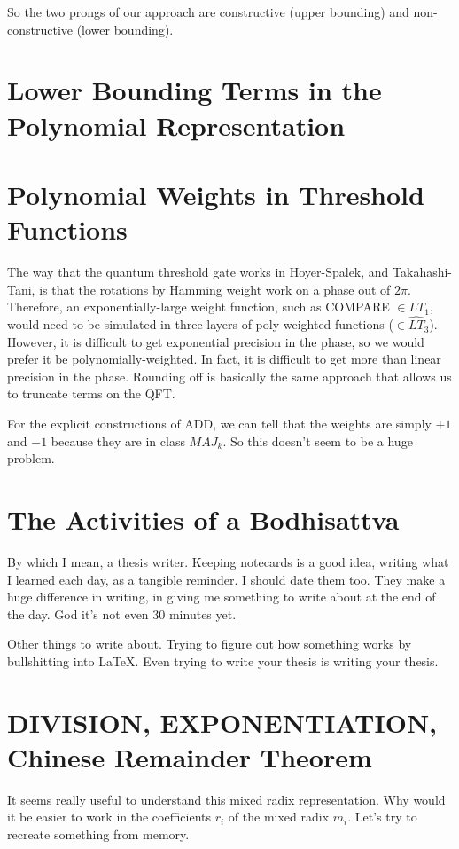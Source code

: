 \documentclass{article}
\begin{document}
So the two prongs of our approach are constructive (upper bounding) 
and non-constructive (lower bounding).

\section{Lower Bounding Terms in the Polynomial Representation}

\section{Polynomial Weights in Threshold Functions}

The way that the quantum threshold gate works in Hoyer-Spalek, and
Takahashi-Tani, is that the rotations by Hamming weight work on a phase
out of $2\pi$. Therefore, an exponentially-large weight function, such
as COMPARE $\in LT_1$, would need to be simulated in three layers of
poly-weighted functions ($\in \hat{LT}_3$). However, it is difficult
to get exponential precision in the phase, so we would prefer it be
polynomially-weighted. In fact, it is difficult to get more than linear
precision in the phase. Rounding off is basically the same approach
that allows us to truncate terms on the QFT.

For the explicit constructions of ADD, we can tell that the weights
are simply $+1$ and $-1$ because they are in class $MAJ_k$.
So this doesn't seem to be a huge problem.

\section{The Activities of a Bodhisattva}

By which I mean, a thesis writer. Keeping notecards is a good idea,
writing what I learned each day, as a tangible reminder. I should date
them too. They make a huge difference in writing, in giving me something
to write about at the end of the day. God it's not even 30 minutes yet.

Other things to write about. Trying to figure out how something works by
bullshitting into LaTeX. Even trying to write your thesis is writing your 
thesis.

\section{DIVISION, EXPONENTIATION, Chinese Remainder Theorem}

It seems really useful to understand this mixed radix representation.
Why would it be easier to work in the coefficients $r_i$ of the
mixed radix $m_i$. Let's try to recreate something from memory.
\end{document}
